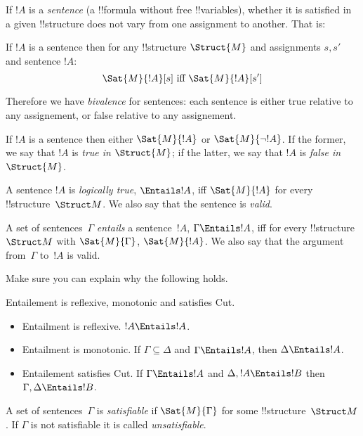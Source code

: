 \documentclass[../../../../include/open-logic-section]{subfiles}
\begin{document}
If $!A$ is a \emph{sentence} (a !!{formula} without free
!!{variable}s), whether it is satisfied in a given !!{structure} does
not vary from one assignment to another. That is:

\begin{prop}
If $!A$ is a sentence then for any !!{structure} $\Struct{M}$ 
and assignments $s,s'$ and sentence $!A$:
$$\Sat{M}{!A}[s]\text{ iff }\Sat{M}{!A}[s']$$
\end{prop}

Therefore we have \emph{bivalence} for sentences: each sentence is 
either true relative to any assignement, or false relative to any
assignement. 

\begin{prop}[Bivalence]
    If $!A$ is a sentence then either $\Sat{M}{!A}$ or 
    $\Sat{M}{\lnot!A}$. If the former, we say that $!A$ is 
    \emph{true in $\Struct{M}$}; if the latter, we say that $!A$
    is \emph{false in $\Struct{M}$}.
\end{prop}

\begin{defn}[Validity]
A sentence $!A$ is \emph{logically true}, $\Entails !A$, iff
$\Sat{M}{!A}$ for every !!{structure}~$\Struct M$. We also say that
the sentence is \emph{valid}.

A set of sentences~$\Gamma$ \emph{entails} a sentence~$!A$, $\Gamma
\Entails !A$, iff for every !!{structure}~$\Struct M$ with
$\Sat{M}{\Gamma}$, $\Sat{M}{!A}$. We also say that the argument
from~$\Gamma$ to~$!A$ is valid.
\end{defn}

Make sure you can explain why the following holds.

\begin{prop}
    Entailement is reflexive, monotonic and satisfies Cut.
    \begin{itemize}
    \item Entailment is reflexive. $!A\Entails !A$.
    \item Entailment is monotonic. If $\Gamma \subseteq \Delta$ and 
    $\Gamma \Entails !A$, then $\Delta \Entails !A$.
    \item Entailement satisfies Cut. If $\Gamma\Entails !A$ and 
    $\Delta, !A \Entails !B$ then $\Gamma,\Delta \Entails !B$.
    \end{itemize}
\end{prop}

\begin{defn}[Satisfiability]
A set of sentences~$\Gamma$ is \emph{satisfiable} if $\Sat{M}{\Gamma}$
for some !!{structure}~$\Struct M$.  If $\Gamma$ is not satisfiable it is
called \emph{unsatisfiable}.
\end{defn}
\end{document}
